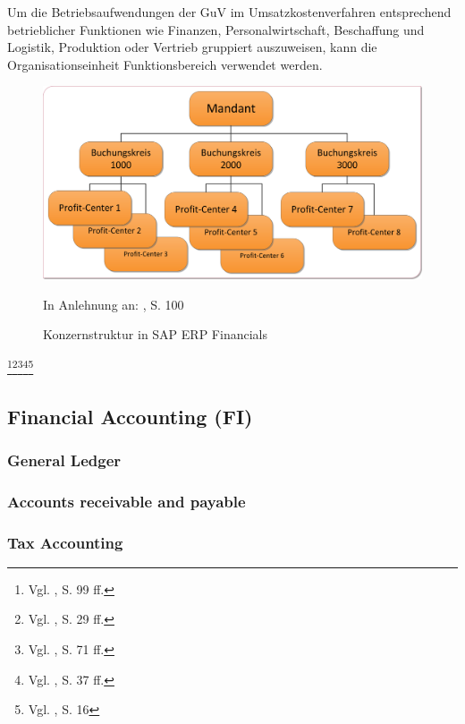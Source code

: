 Um die Betriebsaufwendungen der GuV im Umsatzkostenverfahren entsprechend betrieblicher Funktionen wie Finanzen, Personalwirtschaft, Beschaffung und Logistik, Produktion oder Vertrieb gruppiert auszuweisen, kann die Organisationseinheit Funktionsbereich verwendet werden.

\begin{figure}[htbp]
\includegraphics[width=1\textwidth]{Images/konzernStruktur.png}
\begin{center}
   {\footnotesize In Anlehnung an: \cite{Hefner2001}, S. 100}
   \caption[Konzernstruktur in SAP ERP Financials]{Konzernstruktur in SAP ERP Financials}\label{abb2}
\end{center}
\end{figure}\noindent


\footnote{Vgl. \cite{Hefner2001}, S. 99 ff.}\footnote{Vgl. \cite{Friedl2008}, S. 29 ff.}\footnote{Vgl. \cite{Maassen2006}, S. 71 ff.}\footnote{Vgl. \cite{Patel2009}, S. 37 ff.}\footnote{Vgl. \cite{Padhi2011}, S. 16} 



\subsection{Financial Accounting (FI)} %
\subsubsection{General Ledger} %
\subsubsection{Accounts receivable and payable} %
\subsubsection{Tax Accounting} %


